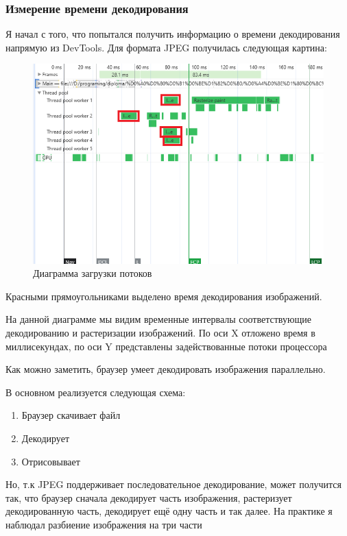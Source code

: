 \documentclass[12pt]{article}
\begin{document}
\subsubsection{Измерение времени декодирования}

Я начал с того, что попытался получить информацию о времени декодирования напрямую
из DevTools. Для формата JPEG получилась следующая картина:

\begin{figure}[H]
    \centering
    \includegraphics[width=1\textwidth]{../images/image_comp/devtools.png}
    \caption{Диаграмма загрузки потоков}
\end{figure}

Красными прямоугольниками выделено время декодирования изображений.

На данной диаграмме мы видим временные интервалы соответствующие декодированию и растеризации изображений.
По оси X отложено время в миллисекундах, по оси Y представлены задействованные потоки процессора

Как можно заметить, браузер умеет декодировать изображения параллельно.

В основном реализуется следующая схема:

\begin{enumerate}
    \item Браузер скачивает файл
    \item Декодирует
    \item Отрисовывает
\end{enumerate}

Но, т.к JPEG поддерживает последовательное декодирование,
может получится так, что браузер сначала декодирует часть изображения,
растеризует декодированную часть, декодирует ещё одну часть и так далее.
На практике я наблюдал разбиение изображения на три части
\end{document}

